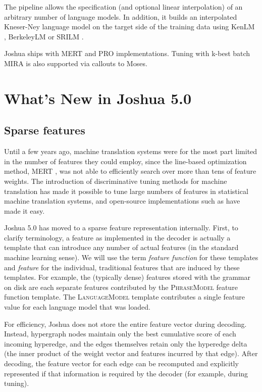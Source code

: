 \documentclass[11pt]{article}
\begin{document}
The pipeline allows the specification (and optional linear
interpolation) of an arbitrary number of language models.  In
addition, it builds an interpolated Kneser-Ney language model on the
target side of the training data using KenLM
\cite{KenLM,Heafield-estimate}, BerkeleyLM \cite{BerkeleyLM} or SRILM
\cite{SRILM}. 

Joshua ships with MERT \cite{Och2003} and PRO implementations.  Tuning
with k-best batch MIRA \cite{cherry2012batch} is also supported via
callouts to Moses.

\section{What's New in Joshua 5.0}

\subsection{Sparse features}
\label{sec:sparse}

Until a few years ago, machine translation systems were for the most
part limited in the number of features they could employ, since the
line-based optimization method, MERT \cite{Och2003}, was not able to
efficiently search over more than tens of feature weights.  The
introduction of discriminative tuning methods for machine translation
\cite{liang2006end,tillmann-zhang:2006:COLACL,chiang2008online,PRO2011}
has made it possible to tune large numbers of features in statistical
machine translation systems, and open-source implementations such as
 have made it easy.

Joshua 5.0 has moved to a sparse feature representation
internally. First, to clarify terminology, a feature as implemented in
the decoder is actually a template that can introduce any number of
actual features (in the standard machine learning sense). We will use
the term \emph{feature function} for these templates and
\emph{feature} for the individual, traditional features that are
induced by these templates. For example, the (typically dense)
features stored with the grammar on disk are each separate features
contributed by the \textsc{PhraseModel} feature function template. The
\textsc{LanguageModel} template contributes a single feature value for
each language model that was loaded.

For efficiency, Joshua does not store the entire feature vector during
decoding.  Instead, hypergraph nodes maintain only the best cumulative
score of each incoming hyperedge, and the edges themselves retain only
the hyperedge delta (the inner product of the weight vector and
features incurred by that edge).  After decoding, the feature vector
for each edge can be recomputed and explicitly represented if that
information is required by the decoder (for example, during tuning).
\end{document}
